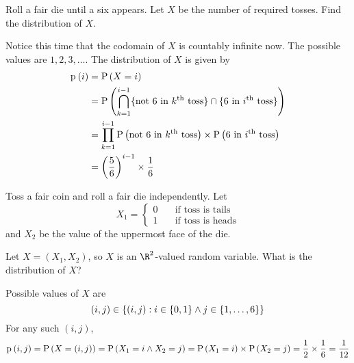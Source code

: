 \documentclass[11pt]{article}
\begin{document}
\begin{eg}
    \label{eg:distribution-of-until-6}
    Roll a fair die until a six appears. Let $X$ be the number of required
    tosses. Find the distribution of $X$.
\end{eg}

\begin{solution}
    Notice this time that the codomain of $X$ is countably infinite now. The
    possible values are $1,2,3,\ldots$. The distribution of $X$ is given by
    \begin{align*}
        \p{i} &= \P{X = i} \\
        &= \P{
            \Intersn_{k=1}^{i-1} \{
                \text{not $6$ in $k$\textsuperscript{th} toss}
            \}
            \intersn
            \{\text{$6$ in $i$\textsuperscript{th} toss}\}
        } \\
        &= \prod_{k=1}^{i-1} \P{\text{not $6$ in $k$\textsuperscript{th} toss}}
        \times \P{\text{$6$ in $i$\textsuperscript{th} toss}} \\
        &= \parens{\frac{5}{6}}^{i-1} \times \frac{1}{6}
    \end{align*}
\end{solution}

\begin{eg}
    Toss a fair coin and roll a fair die independently.
    Let
    \begin{equation*}
        X_1 = \begin{cases}
            0 &\quad\text{if toss is tails} \\
            1 &\quad\text{if toss is heads}
        \end{cases}
    \end{equation*}
    and $X_2$ be the value of the uppermost face of the die.

    Let $X = (X_1, X_2)$, so $X$ is an $\R^2$-valued random variable.
    What is the distribution of $X$?
\end{eg}

\begin{solution}
    Possible values of $X$ are
    \begin{equation*}
        (i, j) \in \{(i, j) : i \in \{0, 1\} \land j \in \range{6} \}
    \end{equation*}
    For any such $(i, j)$,
    \begin{equation*}
        \p{i, j}
        = \P{X = (i, j)}
        = \P{X_1 = i \land X_2 = j}
        = \P{X_1 = i} \times \P{X_2 = j}
        = \frac{1}{2} \times \frac{1}{6}
        = \frac{1}{12}
    \end{equation*}
\end{solution}
\end{document}
